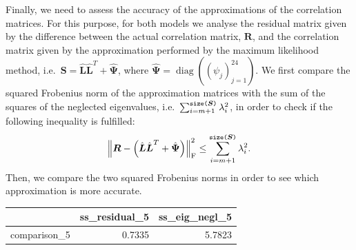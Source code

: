 \documentclass[
]{article}
\newenvironment{Shaded}{\begin{snugshade}}{\end{snugshade}}
\newcommand{\DecValTok}[1]{\textcolor[rgb]{0.00,0.00,0.81}{#1}}
\newcommand{\FunctionTok}[1]{\textcolor[rgb]{0.13,0.29,0.53}{\textbf{#1}}}
\newcommand{\NormalTok}[1]{#1}
\newcommand{\OtherTok}[1]{\textcolor[rgb]{0.56,0.35,0.01}{#1}}
\newcommand{\SpecialCharTok}[1]{\textcolor[rgb]{0.81,0.36,0.00}{\textbf{#1}}}
\theoremstyle{plain}
\begin{document}
\vspace{-12pt}

Finally, we need to assess the accuracy of the approximations of the
correlation matrices. For this purpose, for both models we analyse the
residual matrix given by the difference between the actual correlation
matrix, \(\boldsymbol{R}\), and the correlation matrix given by the
approximation performed by the maximum likelihood method,
i.e.~\(\boldsymbol{S} = \hat{\boldsymbol{L}}\hat{\boldsymbol{L}}^{T} + \hat{\boldsymbol{\Psi}}\),
where
\(\hat{\boldsymbol{\Psi}} = \operatorname{diag}\left((\psi_j)_{j = 1}^{24}\right)\).
\newline  We first compare the squared Frobenius norm of the
approximation matrices with the sum of the squares of the neglected
eigenvalues,
i.e.~\(\sum_{i = m + 1}^{\text{\texttt{size(}$\boldsymbol{S}$\texttt{)}}} \lambda_i^2\),
in order to check if the following inequality is fulfilled: \[
    \left\|\boldsymbol{R} - \left(\hat{\boldsymbol{L}}\hat{\boldsymbol{L}}^{T} + \hat{\boldsymbol{\Psi}}\right)\right\|^2_{\rm{F}} \leq \sum_{i = m + 1}^{\text{\texttt{size(}$\boldsymbol{S}$\texttt{)}}} \lambda_i^2.
\] Then, we compare the two squared Frobenius norms in order to see
which approximation is more accurate.

\smallskip

\begin{Shaded}
\end{Shaded}

\begin{longtable}[]{@{}lrr@{}}
\toprule\noalign{}
& ss\_residual\_5 & ss\_eig\_negl\_5 \\
\midrule\noalign{}
\endhead
\bottomrule\noalign{}
\endlastfoot
comparison\_5 & 0.7335 & 5.7823 \\
\end{longtable}
\end{document}

